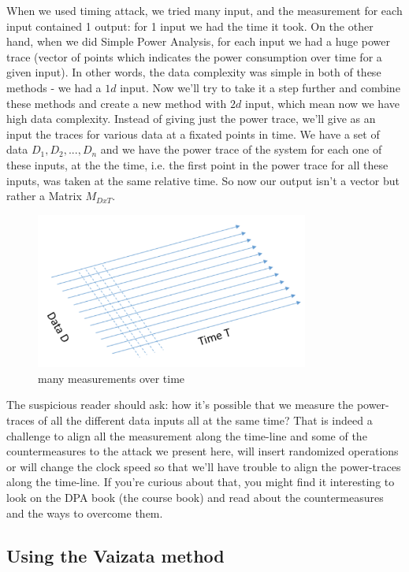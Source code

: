 When we used timing attack, we tried many input, and the measurement for each
input contained 1 output: for 1 input we had the time it took. On the other
hand, when we did Simple Power Analysis, for each input we had a huge power
trace (vector of points which indicates the power consumption over time for a
given input). In other words, the data complexity was simple in both of these
methods - we had a $1d$ input. Now we'll try to take it a step further and
combine these methods and create a new method with $2d$ input, which mean now we
have high data complexity. Instead of giving just the power trace, we'll give as
an input the traces for various data at a fixated points in time. We have a set
of data ${D_1, D_2, ..., D_n}$ and we have the power trace of the system for
each one of these inputs, at the the time, i.e. the first point in the power
trace for all these inputs, was taken at the same relative time. So now our
output isn't a vector but rather a Matrix $M_{DxT}$.

\begin{figure}[!ht]
    \centering
    \includegraphics[width=0.8\textwidth]{images/Lecture6/DPA_Illustration.png}
    \caption{many measurements over time} \label{fig:DPA_Illustration}
\end{figure}

The suspicious reader should ask: how it's possible that we measure the
power-traces of all the different data inputs all at the same time? That is
indeed a challenge to align all the measurement along the time-line and some of
the countermeasures to the attack we present here, will insert randomized
operations or will change the clock speed so that we'll have trouble to align
the power-traces along the time-line. If you're curious about that, you might
find it interesting to look on the DPA book (the course book) and read about the
countermeasures and the ways to overcome them.

\subsection{Using the Vaizata method}

